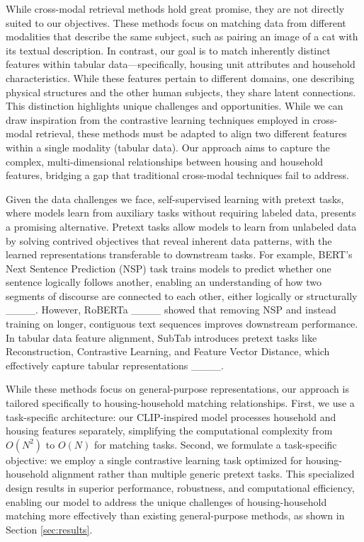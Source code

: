 While cross-modal retrieval methods hold great promise, they are not directly suited to our objectives. These methods focus on matching data from different modalities that describe the same subject, such as pairing an image of a cat with its textual description. In contrast, our goal is to match inherently distinct features within tabular data—specifically, housing unit attributes and household characteristics. While these features pertain to different domains, one describing physical structures and the other human subjects, they share latent connections. This distinction highlights unique challenges and opportunities. While we can draw inspiration from the contrastive learning techniques employed in cross-modal retrieval, these methods must be adapted to align two different features within a single modality (tabular data). Our approach aims to capture the complex, multi-dimensional relationships between housing and household features, bridging a gap that traditional cross-modal techniques fail to address.

Given the data challenges we face, self-supervised learning with pretext tasks, where models learn from auxiliary tasks without requiring labeled data, presents a promising alternative. Pretext tasks allow models to learn from unlabeled data by solving contrived objectives that reveal inherent data patterns, with the learned representations transferable to downstream tasks. For example, BERT’s Next Sentence Prediction (NSP) task trains models to predict whether one sentence logically follows another, enabling an understanding of how two segments of discourse are connected to each other, either logically or structurally ____. However, RoBERTa ____ showed that removing NSP and instead training on longer, contiguous text sequences improves downstream performance. In tabular data feature alignment, SubTab introduces pretext tasks like Reconstruction, Contrastive Learning, and Feature Vector Distance, which effectively capture tabular representations ____. 

While these methods focus on general-purpose representations, our approach is tailored specifically to housing-household matching relationships. First, we use a task-specific architecture: our CLIP-inspired model processes household and housing features separately, simplifying the computational complexity from $O(N^2)$ to $O(N)$ for matching tasks. Second, we formulate a task-specific objective: we employ a single contrastive learning task optimized for housing-household alignment rather than multiple generic pretext tasks. This specialized design results in superior performance, robustness, and computational efficiency, enabling our model to address the unique challenges of housing-household matching more effectively than existing general-purpose methods, as shown in Section \ref{sec:results}.